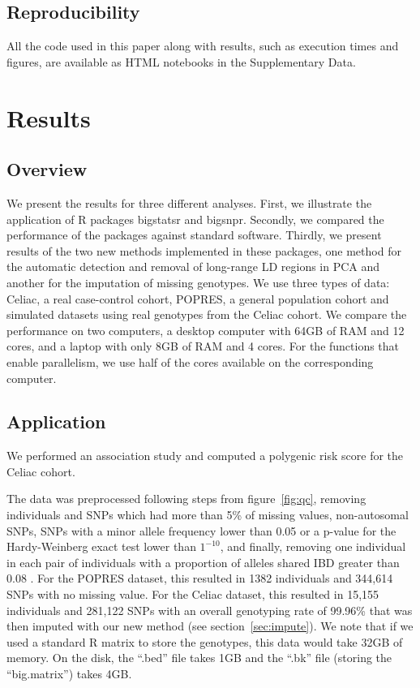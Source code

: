 \documentclass{bioinfo}
\begin{document}
\subsection{Reproducibility}

All the code used in this paper along with results, such as execution times and figures, are available as HTML notebooks in the Supplementary Data.

\section{Results}

\subsection{Overview}\label{sec:overview}

We present the results for three different analyses. First, we illustrate the application of R packages bigstatsr and bigsnpr. Secondly, we compared the performance of the packages against standard software. Thirdly, we present results of the two new methods implemented in these packages, one method for the automatic detection and removal of long-range LD regions in PCA and another for the imputation of missing genotypes. We use three types of data: Celiac, a real case-control cohort, POPRES, a general population cohort and simulated datasets using real genotypes from the Celiac cohort. We compare the performance on two computers, a desktop computer with 64GB of RAM and 12 cores, and a laptop with only 8GB of RAM and 4 cores. For the functions that enable parallelism, we use half of the cores available on the corresponding computer.

\subsection{Application}
 
We performed an association study and computed a polygenic risk score for the Celiac cohort. 

The data was preprocessed following steps from figure~\ref{fig:qc}, removing individuals and SNPs which had more than 5\% of missing values, non-autosomal SNPs, SNPs with a minor allele frequency lower than 0.05 or a p-value for the Hardy-Weinberg exact test lower than $1^{-10}$, and finally, removing one individual in each pair of individuals with a proportion of alleles shared IBD greater than 0.08 \cite[]{Purcell2007}. 
For the POPRES dataset, this resulted in 1382 individuals and 344,614 SNPs with no missing value.
For the Celiac dataset, this resulted in 15,155 individuals and 281,122 SNPs with an overall genotyping rate of 99.96\% that was then imputed with our new method (see section~\ref{sec:impute}). We note that if we used a standard R matrix to store the genotypes, this data would take 32GB of memory. On the disk, the ``.bed'' file takes 1GB and the ``.bk'' file (storing the ``big.matrix'') takes 4GB. 
\end{document}

